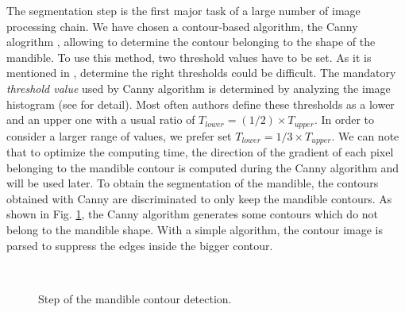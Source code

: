 \documentclass[twoside,twocolumn,10pt]{article}
\begin{document}
The segmentation step is the first major task of a large number of image processing
chain. We have chosen a contour-based algorithm, the
Canny alogrithm \cite{canny1986computational}, allowing to determine the 
contour belonging to the shape of the mandible.
To use this method, two threshold values have to be set.
As it is mentioned in \cite{adaptiveCanny}, determine the right thresholds could be difficult.
The mandatory \textit{threshold value} used by Canny algorithm is determined by analyzing the image
histogram (see \cite{leestimating} for detail). Most often authors define these thresholds as a lower and an upper one with a usual ratio of $T_{lower} = (1/2) \times T_{upper}$.
In order to consider a larger range of values, we prefer set $T_{lower} = 1/3 \times T_{upper}$.
We can note that to optimize the computing time, the direction of the gradient of each pixel belonging to the mandible contour is computed during the Canny algorithm and will be used later.
To obtain the segmentation of the mandible, the contours obtained with Canny are discriminated to only keep the mandible contours.
As shown in Fig. \ref{canny}, the Canny algorithm generates some contours which do not belong to the mandible shape.
With a simple algorithm, the contour image is parsed to suppress the edges inside the bigger contour.
\begin{figure}[htb]
\centering
{}~~ 
\caption{Step of the mandible contour detection.}
\label{canny}
\end{figure}
\end{document}
